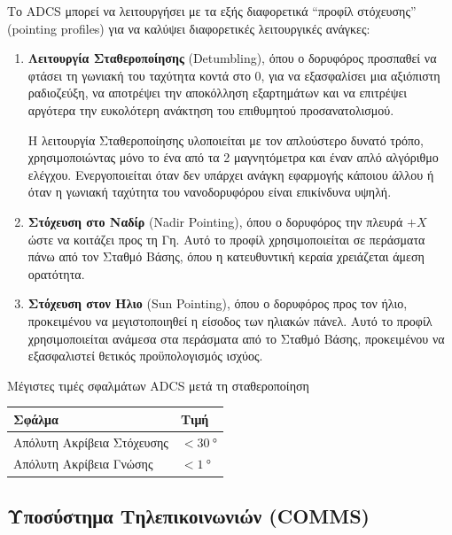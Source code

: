 \documentclass[a4paper,nobib]{tufte-book}
\begin{document}
Το \ac{ADCS} μπορεί να λειτουργήσει με τα εξής διαφορετικά ``προφίλ στόχευσης'' (pointing profiles) για να καλύψει διαφορετικές λειτουργικές ανάγκες:
\begin{enumerate}
	\item \textbf{Λειτουργία Σταθεροποίησης} (Detumbling), όπου ο δορυφόρος προσπαθεί να φτάσει τη γωνιακή του ταχύτητα κοντά στο 0, για να εξασφαλίσει μια αξιόπιστη ραδιοζεύξη, να αποτρέψει την αποκόλληση εξαρτημάτων και να επιτρέψει αργότερα την ευκολότερη ανάκτηση του επιθυμητού προσανατολισμού.
	
	Η λειτουργία Σταθεροποίησης υλοποιείται με τον απλούστερο δυνατό τρόπο, χρησιμοποιώντας μόνο το ένα από τα 2 μαγνητόμετρα και έναν απλό αλγόριθμο ελέγχου. Ενεργοποιείται όταν δεν υπάρχει ανάγκη εφαρμογής κάποιου άλλου ή όταν η γωνιακή ταχύτητα του νανοδορυφόρου είναι επικίνδυνα υψηλή.
	
	\item \textbf{Στόχευση στο Ναδίρ} (Nadir Pointing), όπου ο δορυφόρος  την πλευρά \(+X\) ώστε να κοιτάζει προς τη Γη. Αυτό το προφίλ χρησιμοποιείται σε περάσματα πάνω από τον Σταθμό Βάσης, όπου η κατευθυντική κεραία χρειάζεται άμεση ορατότητα.
	
	\item \textbf{Στόχευση στον Ήλιο} (Sun Pointing), όπου ο δορυφόρος  προς τον ήλιο, προ\-κει\-μέ\-νου να μεγιστοποιηθεί η είσοδος των ηλιακών πάνελ. Αυτό το προφίλ χρησιμοποιείται ανάμεσα στα περάσματα από το Σταθμό Βάσης, προκειμένου να εξασφαλιστεί θετικός προϋπολογισμός ισχύος.
\end{enumerate}

\begin{margintable}
	\centering
	\caption[Μέγιστες τιμές σφαλμάτων ADCS μετά τη σταθεροποίηση]{Μέγιστες τιμές σφαλμάτων \ac{ADCS} μετά τη σταθεροποίηση}
	\label{tab:adcsape}
	\begin{tabular}{@{}ll@{}}
		\toprule
		Σφάλμα                      & Τιμή                    \\ \midrule
		Απόλυτη Ακρίβεια Στόχευσης & \( < \SI{30}{\degree} \) \\
		Απόλυτη Ακρίβεια Γνώσης    & \( < \SI{1}{\degree} \) 
	\end{tabular}
\end{margintable}


\subsection{Υποσύστημα Τηλεπικοινωνιών (\acs{COMMS})}
\end{document}
